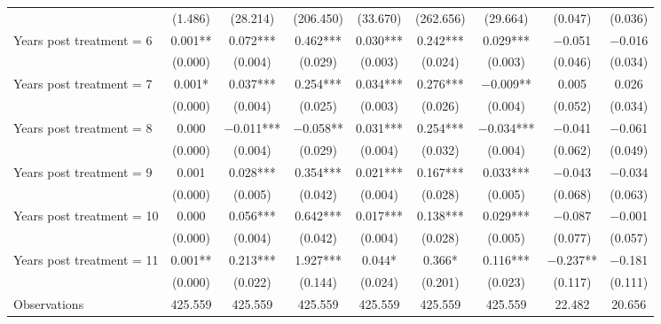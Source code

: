 \begin{table}[H]
{\begin{threeparttable}
\begin{tabular}[t]{lcccccccc}
 & (\num{ 1.486}) & (\num{   28.214}) & (\num{  206.450}) & (\num{   33.670}) & (\num{   262.656}) & (\num{   29.664}) & (\num{0.047}) & (\num{0.036})\\
Years post treatment = 6 & \num{ 0.001}** & \num{ 0.072}*** & \num{ 0.462}*** & \num{ 0.030}*** & \num{ 0.242}*** & \num{ 0.029}*** & \num{-0.051} & \num{-0.016}\\
 & (\num{ 0.000}) & (\num{    0.004}) & (\num{    0.029}) & (\num{    0.003}) & (\num{     0.024}) & (\num{    0.003}) & (\num{0.046}) & (\num{0.034})\\
Years post treatment = 7 & \num{ 0.001}* & \num{ 0.037}*** & \num{ 0.254}*** & \num{ 0.034}*** & \num{ 0.276}*** & \num{-0.009}** & \num{ 0.005} & \num{ 0.026}\\
 & (\num{ 0.000}) & (\num{    0.004}) & (\num{    0.025}) & (\num{    0.003}) & (\num{     0.026}) & (\num{    0.004}) & (\num{0.052}) & (\num{0.034})\\
Years post treatment = 8 & \num{ 0.000} & \num{-0.011}*** & \num{-0.058}** & \num{ 0.031}*** & \num{ 0.254}*** & \num{-0.034}*** & \num{-0.041} & \num{-0.061}\\
 & (\num{ 0.000}) & (\num{    0.004}) & (\num{    0.029}) & (\num{    0.004}) & (\num{     0.032}) & (\num{    0.004}) & (\num{0.062}) & (\num{0.049})\\
Years post treatment = 9 & \num{ 0.001} & \num{ 0.028}*** & \num{ 0.354}*** & \num{ 0.021}*** & \num{ 0.167}*** & \num{ 0.033}*** & \num{-0.043} & \num{-0.034}\\
 & (\num{ 0.000}) & (\num{    0.005}) & (\num{    0.042}) & (\num{    0.004}) & (\num{     0.028}) & (\num{    0.005}) & (\num{0.068}) & (\num{0.063})\\
Years post treatment = 10 & \num{ 0.000} & \num{ 0.056}*** & \num{ 0.642}*** & \num{ 0.017}*** & \num{ 0.138}*** & \num{ 0.029}*** & \num{-0.087} & \num{-0.001}\\
 & (\num{ 0.000}) & (\num{    0.004}) & (\num{    0.042}) & (\num{    0.004}) & (\num{     0.028}) & (\num{    0.005}) & (\num{0.077}) & (\num{0.057})\\
Years post treatment = 11 & \num{ 0.001}** & \num{ 0.213}*** & \num{ 1.927}*** & \num{ 0.044}* & \num{ 0.366}* & \num{ 0.116}*** & \num{-0.237}** & \num{-0.181}\\
 & (\num{ 0.000}) & (\num{    0.022}) & (\num{    0.144}) & (\num{    0.024}) & (\num{     0.201}) & (\num{    0.023}) & (\num{0.117}) & (\num{0.111})\\
\midrule
Observations & \num{425,559} & \num{425,559} & \num{425,559} & \num{425,559} & \num{425,559} & \num{425,559} & \num{22,482} & \num{20,656}\\

\end{tabular}
\end{threeparttable}}
\end{table}
